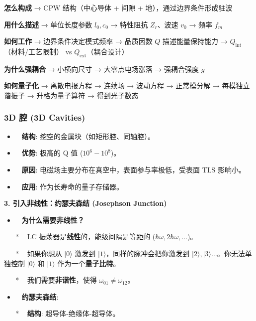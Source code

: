 \documentclass[12pt,a4paper,oneside]{ctexbook}
\providecommand{\tightlist}{%
  \setlength{\itemsep}{0pt}\setlength{\parskip}{0pt}}
\begin{document}
\textbf{怎么构成} → CPW 结构（中心导体 + 间隙 +
地），通过边界条件形成驻波

\textbf{用什么描述} → 单位长度参数 \(l_0,c_0\) → 特性阻抗 \(Z_r\)、波速
\(v_0\) → 频率 \(f_m\)

\textbf{如何工作} → 边界条件决定模式频率 → 品质因数 \(Q\)
描述能量保持能力 → \(Q_{\text{int}}\)（材料/工艺限制） vs
\(Q_{\text{ext}}\)（耦合设计）

\textbf{为什么强耦合} → 小横向尺寸 → 大零点电场涨落 → 强耦合强度 \(g\)

\textbf{如何量子化} → 离散电报方程 → 连续场 → 波动方程 → 正常模分解 →
每模独立谐振子 → 升格为量子算符 → 得到光子数态

\subsubsection{3D 腔 (3D Cavities)}\label{b.-3d-ux8154-3d-cavities}

\begin{itemize}
\item
  ~ \textbf{结构}: 挖空的金属块（如矩形腔、同轴腔）。
\item
  ~ \textbf{优势}: 极高的 Q 值 (\(10^6 - 10^8\))。
\item
  ~ \textbf{原因}: 电磁场主要分布在真空中，表面参与率极低，受表面 TLS
  影响小。
\item
  ~ \textbf{应用}: 作为长寿命的量子存储器。
\end{itemize}

\textbf{3. 引入非线性：约瑟夫森结 (Josephson
Junction)}
\begin{itemize}
\tightlist
\item
  ~ \textbf{为什么需要非线性？}
\end{itemize}

~ ~ * ~ LC 振荡器是\textbf{线性}的，能级间隔是等距的
(\(\hbar \omega, 2\hbar \omega, \dots\))。

~ ~ * ~ 如果你想从 \(|0\rangle\) 激发到
\(|1\rangle\)，同样的脉冲会把你激发到
\(|2\rangle, |3\rangle \dots\)。你无法单独控制 \(|0\rangle\) 和
\(|1\rangle\) 作为一个\textbf{量子比特}。

~ ~ * ~ 我们需要\textbf{非谐性}，使得 \(\omega_{01} \neq \omega_{12}\)。

\begin{itemize}
\tightlist
\item
  ~ \textbf{约瑟夫森结}:
\end{itemize}

~ ~ * ~ \textbf{结构}: 超导体-绝缘体-超导体。
\end{document}
